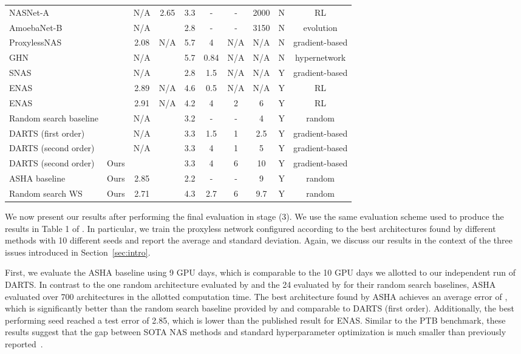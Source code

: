 \documentclass[acmlarge, nonacm]{acmart}
\begin{document}
\begin{table}[h]
{\begin{tabular}{lccccccccc}
\hline
NASNet-A & \citep{Zoph2018LearningTA} & N/A & 2.65 & 3.3 &- &-&2000 & N & RL \\
AmoebaNet-B & \citep{Real2018} & N/A &  & 2.8 &- &-&3150 & N & evolution \\
ProxylessNAS & \citep{cai2018proxylessnas} & 2.08 & N/A & 5.7 & 4 & N/A & N/A & N & gradient-based \\
GHN & \citep{zhang2018graph} & N/A &  & 5.7 & 0.84 & N/A & N/A & N & hypernetwork \\
SNAS & \citep{xie2018snas}  & N/A &  & 2.8 & 1.5& N/A & N/A& Y & gradient-based \\
ENAS & \citep{pham18ENAS} & 2.89 & N/A & 4.6 & 0.5 & N/A & N/A & Y & RL \\
ENAS & \citep{liu2018darts} & 2.91 & N/A & 4.2 & 4 & 2& 6 &Y & RL \\
 Random search baseline & \citep{liu2018darts} & N/A &  & 3.2 & -&-&4 & Y & random \\
 DARTS (first order)   & \citep{liu2018darts}   &  N/A &  & 3.3 & 1.5 & 1 & 2.5 & Y & gradient-based\\
 DARTS (second order)& \citep{liu2018darts} &  N/A &  & 3.3 & 4 & 1& 5 &Y & gradient-based \\
\hline
DARTS (second order)&  Ours &   &  & 3.3 & 4 & 6 & 10 & Y & gradient-based \\
ASHA baseline & Ours & 2.85 & & 2.2 & - & - &9 & Y & random\\
 Random search WS &  Ours & 2.71 & & 4.3 & 2.7 & 6 & 9.7 &Y & random \\
 \hline
 
\end{tabular}
}

\end{table}
We now present our results after performing the final evaluation in stage (3).  We use the same evaluation scheme used to produce the results in Table 1 of \citet{liu2018darts}.  In particular, we train the proxyless network configured according to the best architectures found by different methods with 10 different seeds and report the average and standard deviation.  Again, we discuss our results in the context of the three issues introduced in Section~\ref{sec:intro}.

First, we evaluate the ASHA baseline using 9 GPU days, which is comparable to the 10 GPU days we allotted to our independent run of DARTS. 
In contrast to the one random architecture evaluated by \citet{pham18ENAS} and the 24 evaluated by \citet{liu2018darts} for their random search baselines, ASHA evaluated over 700 architectures in the allotted computation time.
The best architecture found by ASHA achieves an average error of , which is significantly better than the random search baseline provided by \citet{liu2018darts} and comparable to DARTS (first order).  Additionally, the best performing seed reached a test error of 2.85, which is lower than the published result for ENAS.   
Similar to the PTB benchmark, these results suggest that the 
gap between SOTA NAS methods and standard hyperparameter optimization is much smaller than previously reported~\citep{pham18ENAS, liu2018darts}. 
\end{document}
